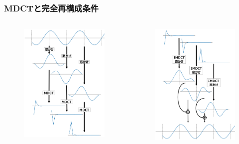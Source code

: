 \documentclass[14pt,xcolor=dvipsnames,table,dvipdfmx]{beamer}
\begin{document}
\begin{frame}[c]
    \frametitle{MDCTと完全再構成条件}
    \vspace*{-25pt}
    \begin{columns}
        \begin{column}{0.5\textwidth}
            \begin{figure}
                \includegraphics[width=60mm]{./figs/halft_overlap_add_encode.png}
            \end{figure}
        \end{column}
        \begin{column}{0.5\textwidth}
            \begin{figure}
                \includegraphics[width=60mm]{./figs/halft_overlap_add_decode.png}
            \end{figure}
        \end{column}
    \end{columns}
\end{frame}
\end{document}
